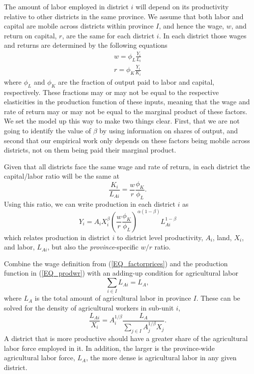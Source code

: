 \documentclass[11pt]{article}
\begin{document}
The amount of labor employed in district $i$ will depend on its productivity relative to other districts in the same province. We assume that both labor and capital are mobile across districts within province $I$, and hence the wage, $w$, and return on capital, $r$, are the same for each district $i$. In each district those wages and returns are determined by the following equations
\begin{eqnarray}
    w = \phi_L \frac{Y_i}{L_i} \\ \nonumber
    r = \phi_K \frac{Y_i}{K_i} \label{EQ_factorprices}
\end{eqnarray}
where $\phi_L$ and $\phi_K$ are the fraction of output paid to labor and capital, respectively. These fractions may or may not be equal to the respective elasticities in the production function of these inputs, meaning that the wage and rate of return may or may not be equal to the marginal product of these factors. We set the model up this way to make two things clear. First, that we are not going to identify the value of $\beta$ by using information on shares of output, and second that our empirical work only depends on these factors being mobile across districts, not on them being paid their marginal product.

Given that all districts face the same wage and rate of return, in each district the capital/labor ratio will be the same at
\begin{equation}
    \frac{K_i}{L_{Ai}} = \frac{w}{r}\frac{\phi_K}{\phi_L}. \nonumber
\end{equation}
Using this ratio, we can write production in each district $i$ as
\begin{equation}
Y_{i} = A_{i} X_{i}^{\beta} \left(\frac{w}{r}\frac{\phi_K}{\phi_L}\right)^{\alpha(1-\beta)} L_{Ai}^{1-\beta} \label{EQ_prodwr}
\end{equation}
which relates production in district $i$ to district level productivity, $A_i$, land, $X_i$, and labor, $L_{Ai}$, but also the \textit{province}-specific $w/r$ ratio.

Combine the wage definition from (\ref{EQ_factorprices}) and the production function in (\ref{EQ_prodwr}) with an adding-up condition for agricultural labor 
\begin{equation}
\sum_{i\in I} L_{Ai} = L_A, \nonumber
\end{equation}
where $L_A$ is the total amount of agricultural labor in province $I$. These can be solved for the density of agricultural workers in sub-unit $i$,
\begin{equation}
\frac{L_{Ai}}{X_i} = A_{i}^{1/\beta}\frac{L_A}{\sum_{j\in I} A_{j}^{1/\beta}X_{j}}. \label{EQ_LaX}
\end{equation}
A district that is more productive should have a greater share of the agricultural labor force employed in it. In addition, the larger is the province-wide agricultural labor force, $L_A$, the more dense is agricultural labor in any given district.
\end{document}
